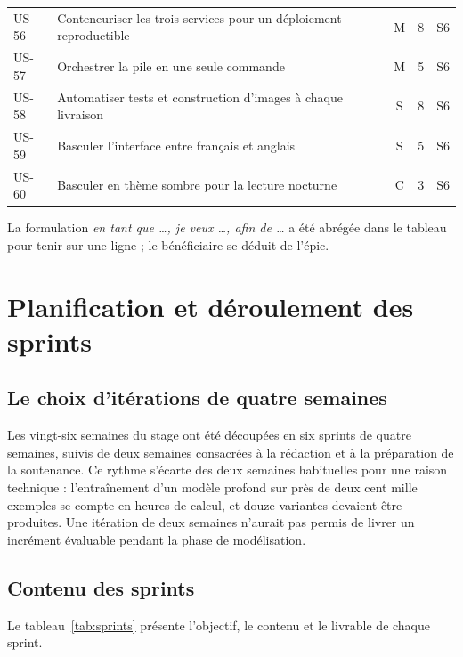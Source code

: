 \begin{longtable}{@{}p{1.25cm}L{9.1cm}cp{0.75cm}p{0.9cm}@{}}
US-56 & Conteneuriser les trois services pour un déploiement reproductible
& M & 8 & S6 \\
US-57 & Orchestrer la pile en une seule commande & M & 5 & S6 \\
US-58 & Automatiser tests et construction d'images à chaque livraison & S & 8 & S6 \\
US-59 & Basculer l'interface entre français et anglais & S & 5 & S6 \\
US-60 & Basculer en thème sombre pour la lecture nocturne & C & 3 & S6 \\
\end{longtable}

\noindent
La formulation \emph{en tant que \dots, je veux \dots, afin de \dots} a été abrégée
dans le tableau pour tenir sur une ligne ; le bénéficiaire se déduit de l'épic.

\section{Planification et déroulement des sprints}

\subsection{Le choix d'itérations de quatre semaines}

Les vingt-six semaines du stage ont été découpées en six sprints de quatre semaines,
suivis de deux semaines consacrées à la rédaction et à la préparation de la
soutenance. Ce rythme s'écarte des deux semaines habituelles pour une raison
technique : l'entraînement d'un modèle profond sur près de deux cent mille exemples
se compte en heures de calcul, et douze variantes devaient être produites. Une
itération de deux semaines n'aurait pas permis de livrer un incrément évaluable
pendant la phase de modélisation.

\subsection{Contenu des sprints}

Le tableau~\ref{tab:sprints} présente l'objectif, le contenu et le livrable de chaque
sprint.


